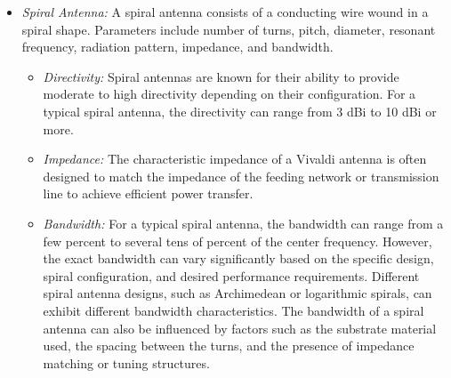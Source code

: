\documentclass[11pt,a4paper]{article}
\begin{document}
\begin{itemize}
    \item \emph{Spiral Antenna:} A spiral antenna consists of a conducting wire wound in a spiral shape. Parameters include number of turns, pitch, diameter, resonant frequency, radiation pattern, impedance, and bandwidth.
    \begin{itemize}
        \item \emph{Directivity:} Spiral antennas are known for their ability to provide moderate to high directivity depending on their configuration. For a typical spiral antenna, the directivity can range from 3 dBi to 10 dBi or more.
        \item \emph{Impedance:} The characteristic impedance of a Vivaldi antenna is often designed to match the impedance of the feeding network or transmission line to achieve efficient power transfer.
        \item \emph{Bandwidth:} For a typical spiral antenna, the bandwidth can range from a few percent to several tens of percent of the center frequency. However, the exact bandwidth can vary significantly based on the specific design, spiral configuration, and desired performance requirements. Different spiral antenna designs, such as Archimedean or logarithmic spirals, can exhibit different bandwidth characteristics. The bandwidth of a spiral antenna can also be influenced by factors such as the substrate material used, the spacing between the turns, and the presence of impedance matching or tuning structures.
    \end{itemize}
    

\end{itemize}
\end{document}
